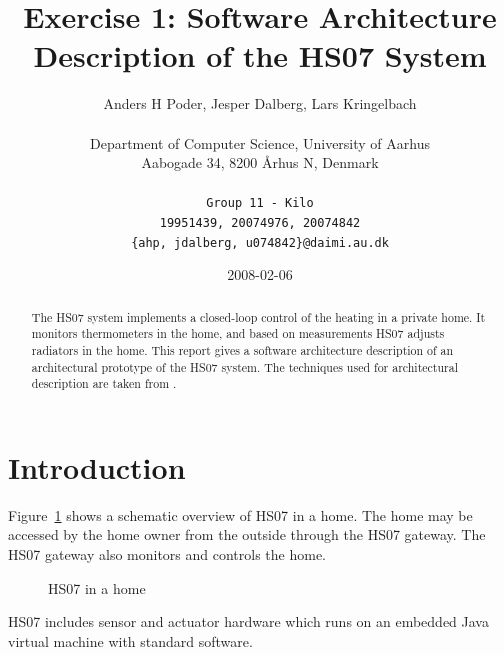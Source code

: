 \documentclass[a4paper,10pt]{article}
\begin{document}
\title{Exercise 1: Software Architecture Description of the HS07 System}

\author{
  Anders H Poder, Jesper Dalberg, Lars Kringelbach\\\\
  Department of Computer Science, University of Aarhus\\
  Aabogade 34, 8200 {\AA}rhus N, Denmark\\\\
  \makeatletter
  \texttt{Group 11 - Kilo}\\
  \texttt{19951439, 20074976, 20074842}\\
  \texttt{\{ahp, jdalberg, u074842\}@daimi.au.dk}
}

\date{2008-02-06}

\maketitle

\begin{abstract}
  The HS07 system implements a closed-loop control of the heating in a
  private home. It monitors thermometers in the home, and based on
  measurements HS07 adjusts radiators in the home. This report gives a
  software architecture description of an architectural prototype of
  the HS07 system. The techniques used for architectural description
  are taken from \cite{christensen2004archdesc}.
\end{abstract}

\section{Introduction}

Figure~\ref{fig:hs07} shows a schematic overview of HS07 in a
home. The home may be accessed by the home owner from the outside
through the HS07 gateway. The HS07 gateway also monitors and controls
the home.
\begin{figure}[!htb]
\centerline{}
\caption{HS07 in a home}
\label{fig:hs07}
\end{figure}

HS07 includes sensor and actuator hardware which runs on an embedded Java virtual
machine with standard software.

\end{document}
